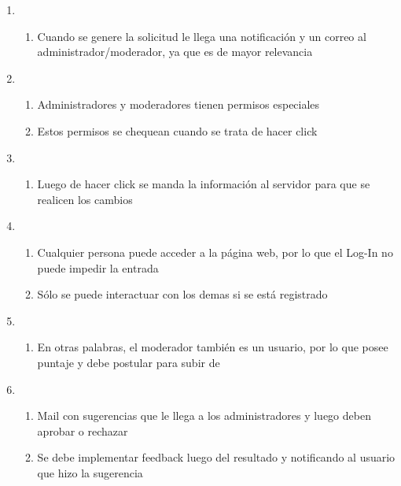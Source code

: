 \documentclass[12pt, letterpaper, notitlepage]{article}
\begin{document}
\begin{enumerate}
	\item {}
		\begin{enumerate}
			\item Cuando se genere la solicitud le llega una notificación y un correo al administrador/moderador, ya que es de mayor relevancia
		\end{enumerate}
		
	\item {}
		\begin{enumerate}
			\item Administradores y moderadores tienen permisos especiales
			\item Estos permisos se chequean cuando se trata de hacer click
		\end{enumerate}
	
	\item {}
		\begin{enumerate}
			\item Luego de hacer click se manda la información al servidor para que se realicen los cambios
		\end{enumerate}
	
	\item {}
		\begin{enumerate}
			\item Cualquier persona puede acceder a la página web, por lo que el Log-In no puede impedir la entrada
			\item Sólo se puede interactuar con los demas si se está registrado
		\end{enumerate}				
		
	\item {}
		\begin{enumerate}
			\item En otras palabras, el moderador también es un usuario, por lo que posee puntaje y debe postular para subir de 
		\end{enumerate}
	
	\item {}
		\begin{enumerate}
			\item Mail con sugerencias que le llega a los administradores y luego deben aprobar o rechazar
			\item Se debe implementar feedback luego del resultado y notificando al usuario que hizo la sugerencia
		\end{enumerate}			
	
\end{enumerate}
\end{document}
